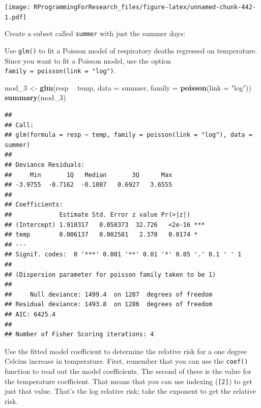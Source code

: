 \documentclass[]{book}
\makeatletter
\newenvironment{Shaded}{\begin{snugshade}}{\end{snugshade}}
\newcommand{\KeywordTok}[1]{\textcolor[rgb]{0.13,0.29,0.53}{\textbf{#1}}}
\newcommand{\DataTypeTok}[1]{\textcolor[rgb]{0.13,0.29,0.53}{#1}}
\newcommand{\DecValTok}[1]{\textcolor[rgb]{0.00,0.00,0.81}{#1}}
\newcommand{\StringTok}[1]{\textcolor[rgb]{0.31,0.60,0.02}{#1}}
\newcommand{\OperatorTok}[1]{\textcolor[rgb]{0.81,0.36,0.00}{\textbf{#1}}}
\newcommand{\NormalTok}[1]{#1}
\newenvironment{kframe}{%
\medskip{}
\setlength{\fboxsep}{.8em}
 \def\at@end@of@kframe{}%
 \ifinner\ifhmode%
  \def\at@end@of@kframe{\end{minipage}}%
  \begin{minipage}{\columnwidth}%
 \fi\fi%
 \def\FrameCommand##1{\hskip\@totalleftmargin \hskip-\fboxsep
 \colorbox{shadecolor}{##1}\hskip-\fboxsep
     \hskip-\linewidth \hskip-\@totalleftmargin \hskip\columnwidth}%
 \MakeFramed {\advance\hsize-\width
   \@totalleftmargin\z@ \linewidth\hsize
   \@setminipage}}%
 {\par\unskip\endMakeFramed%
 \at@end@of@kframe}
\renewenvironment{Shaded}{\begin{kframe}}{\end{kframe}}
\theoremstyle{definition}
\theoremstyle{definition}
\theoremstyle{definition}
\theoremstyle{remark}
\makeatother
\begin{document}
\texttt{[image: RProgrammingForResearch\_files/figure-latex/unnamed-chunk-442-1.pdf]}

Create a subset called \texttt{summer} with just the summer days:

\begin{Shaded}
\end{Shaded}

Use \texttt{glm()} to fit a Poisson model of respiratory deaths
regressed on temperature. Since you want to fit a Poisson model, use the
option \texttt{family\ =\ poisson(link\ =\ "log")}.

\begin{Shaded}
\begin{Highlighting}[]
\NormalTok{mod_}\DecValTok{3}\NormalTok{ <-}\StringTok{ }\KeywordTok{glm}\NormalTok{(resp }\OperatorTok{~}\StringTok{ }\NormalTok{temp, }\DataTypeTok{data =}\NormalTok{ summer,}
             \DataTypeTok{family =} \KeywordTok{poisson}\NormalTok{(}\DataTypeTok{link =} \StringTok{"log"}\NormalTok{))}
\KeywordTok{summary}\NormalTok{(mod_}\DecValTok{3}\NormalTok{)}
\end{Highlighting}
\end{Shaded}

\begin{verbatim}
## 
## Call:
## glm(formula = resp ~ temp, family = poisson(link = "log"), data = summer)
## 
## Deviance Residuals: 
##     Min       1Q   Median       3Q      Max  
## -3.9755  -0.7162  -0.1807   0.6927   3.6555  
## 
## Coefficients:
##             Estimate Std. Error z value Pr(>|z|)    
## (Intercept) 1.910317   0.058373  32.726   <2e-16 ***
## temp        0.006137   0.002581   2.378   0.0174 *  
## ---
## Signif. codes:  0 '***' 0.001 '**' 0.01 '*' 0.05 '.' 0.1 ' ' 1
## 
## (Dispersion parameter for poisson family taken to be 1)
## 
##     Null deviance: 1499.4  on 1287  degrees of freedom
## Residual deviance: 1493.8  on 1286  degrees of freedom
## AIC: 6425.4
## 
## Number of Fisher Scoring iterations: 4
\end{verbatim}

Use the fitted model coefficient to determine the relative risk for a
one degree Celcius increase in temperature. First, remember that you can
use the \texttt{coef()} function to read out the model coefficients. The
second of these is the value for the temperature coefficient. That means
that you can use indexing (\texttt{{[}2{]}}) to get just that value.
That's the log relative risk; take the exponent to get the relative
risk.
\end{document}
